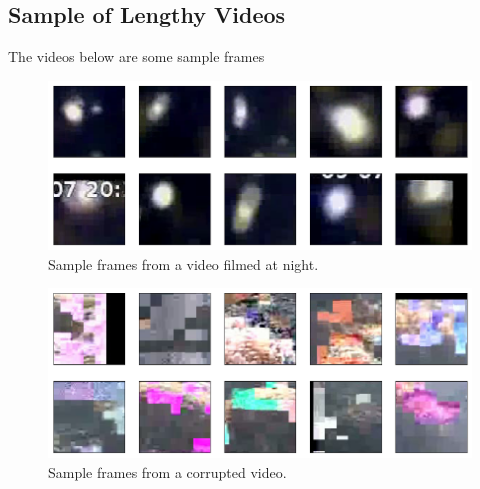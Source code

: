 \documentclass[bsc,logo,twoside,fullspacing,parskip]{infthesis}
\begin{document}
\begin{appendices}
\chapter{Sample of Lengthy Videos}
The videos below are some sample frames

\begin{figure}
\centering
    \includegraphics[scale=0.46]{graph/sample_night.png}
    \caption{Sample frames from a video filmed at night.}
    \label{fig:sample_night}
\end{figure}

\begin{figure}
\centering
    \includegraphics[scale=0.46]{graph/sample_corrupt.png}
    \caption{Sample frames from a corrupted video.}
    \label{fig:sample_corrupt}
\end{figure}


\end{appendices}
\end{document}
